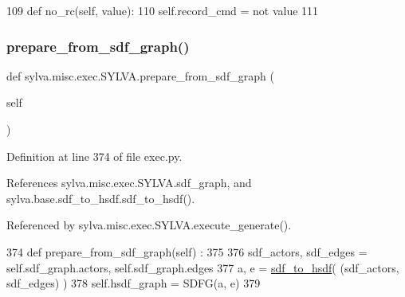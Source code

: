 \begin{DoxyCode}
109   \textcolor{keyword}{def }no\_rc(self, value):
110     self.record\_cmd = \textcolor{keywordflow}{not} value
111 
\end{DoxyCode}
\mbox{\label{classsylva_1_1misc_1_1exec_1_1_s_y_l_v_a_a67e8f5e9056dc12db86331eb50494e7c}} 
\subsubsection{\texorpdfstring{prepare\+\_\+from\+\_\+sdf\+\_\+graph()}{prepare\_from\_sdf\_graph()}}
{\footnotesize\ttfamily def sylva.\+misc.\+exec.\+S\+Y\+L\+V\+A.\+prepare\+\_\+from\+\_\+sdf\+\_\+graph (\begin{DoxyParamCaption}\item[{}]{self }\end{DoxyParamCaption})}



Definition at line 374 of file exec.\+py.



References sylva.\+misc.\+exec.\+S\+Y\+L\+V\+A.\+sdf\+\_\+graph, and sylva.\+base.\+sdf\+\_\+to\+\_\+hsdf.\+sdf\+\_\+to\+\_\+hsdf().



Referenced by sylva.\+misc.\+exec.\+S\+Y\+L\+V\+A.\+execute\+\_\+generate().


\begin{DoxyCode}
374   \textcolor{keyword}{def }prepare\_from\_sdf\_graph(self) :
375 
376     sdf\_actors, sdf\_edges = self.sdf\_graph.actors, self.sdf\_graph.edges
377     a, e = \hyperlink{namespacesylva_1_1base_1_1sdf__to__hsdf_a41dda1a461cf7b083fbd682fc94d5e10}{sdf\_to\_hsdf}( (sdf\_actors, sdf\_edges) )
378     self.hsdf\_graph = SDFG(a, e)
379 
\end{DoxyCode}
\mbox{\label{classsylva_1_1misc_1_1exec_1_1_s_y_l_v_a_a01eb55c566fcdf14c0aef3361b49f38d}} 
